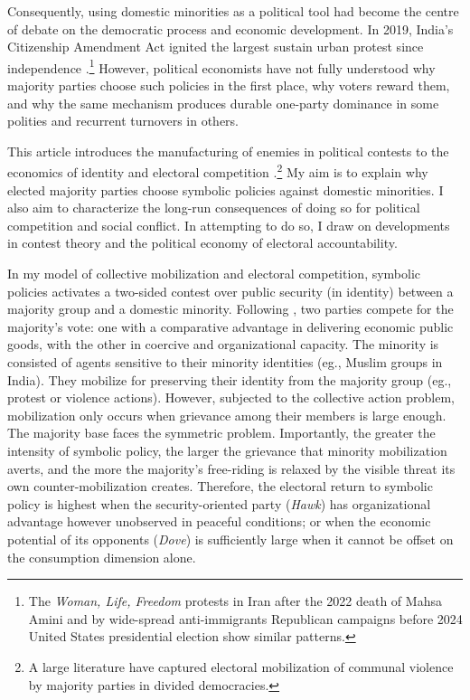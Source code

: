 \documentclass[11pt,twoside]{extarticle}
\begin{document}

Consequently, using domestic minorities as a political tool had become the centre of debate on the democratic process and economic development. In 2019, India's Citizenship Amendment Act ignited the largest sustain urban protest since independence \citep{jaffrelotModisIndiaHindu2021}.\footnote{The \emph{Woman, Life, Freedom} protests in Iran after the 2022 death of Mahsa Amini and by wide-spread anti-immigrants Republican campaigns before 2024 United States presidential election show similar patterns.} However, political economists have not fully understood why majority parties choose such policies in the first place, why voters reward them, and why the same mechanism produces durable one-party dominance in some polities and recurrent turnovers in others.


This article introduces the manufacturing of enemies in political contests to the economics of identity and electoral competition \citep*{shayoModelSocialIdentity2009,glaeserPoliticalEconomyHatred2005,gennaioliIdentityPolitics2023}.\footnote{A large literature have captured electoral mobilization of communal violence by majority parties in divided democracies.} My aim is to explain why elected majority parties choose symbolic policies against domestic minorities. I also aim to characterize the long-run consequences of doing so for political competition and social conflict. In attempting to do so, I draw on developments in contest theory and the political economy of electoral accountability.


In my model of collective mobilization and electoral competition, symbolic policies activates a two-sided contest over public security (in identity) between a majority group and a domestic minority. Following \citet*{baligaStrategyManipulatingConflict2012}, two parties compete for the majority's vote: one with a comparative advantage in delivering economic public goods, with the other in coercive and organizational capacity. The minority is consisted of agents sensitive to their minority identities (eg., Muslim groups in India). They mobilize for preserving their identity from the majority group (eg., protest or violence actions). However, subjected to the collective action problem, mobilization only occurs when grievance among their members is large enough. The majority base faces the symmetric problem. Importantly, the greater the intensity of symbolic policy, the larger the grievance that minority mobilization averts, and the more the majority's free-riding is relaxed by the visible threat its own counter-mobilization creates. Therefore, the electoral return to symbolic policy is highest when the security-oriented party (\emph{Hawk}) has organizational advantage however unobserved in peaceful conditions; or when the economic potential of its opponents (\emph{Dove}) is sufficiently large when it cannot be offset on the consumption dimension alone.
\end{document}
